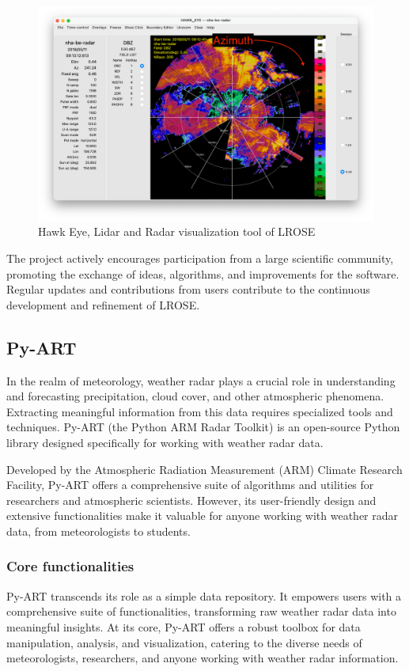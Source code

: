 \begin{figure}[H]
    \centering
    \includegraphics[width=0.8\linewidth]{Images/3.5-hawk-eye.png}
    \caption{Hawk Eye, Lidar and Radar visualization tool of LROSE}
    \label{fig:hawk-eye}
\end{figure}

The project actively encourages participation from a large scientific community,
promoting the exchange of ideas, algorithms, and improvements for the software.
Regular updates and contributions from users contribute to the continuous
development and refinement of LROSE.


\subsection{Py-ART}
In the realm of meteorology, weather radar plays a crucial role in understanding
and forecasting precipitation, cloud cover, and other atmospheric phenomena.
Extracting meaningful information from this data requires specialized tools and
techniques. Py-ART (the Python ARM Radar Toolkit) is an open-source Python
library designed specifically for working with weather radar data.

Developed by the Atmospheric Radiation Measurement (ARM) Climate Research
Facility, Py-ART offers a comprehensive suite of algorithms and utilities for
researchers and atmospheric scientists. However, its user-friendly design and
extensive functionalities make it valuable for anyone working with weather radar
data, from meteorologists to students.

\subsubsection{Core functionalities}
Py-ART transcends its role as a simple data repository. It empowers users with a
comprehensive suite of functionalities, transforming raw weather radar data into
meaningful insights.  At its core, Py-ART offers a robust toolbox for data
manipulation, analysis, and visualization, catering to the diverse needs of
meteorologists, researchers, and anyone working with weather radar information.

